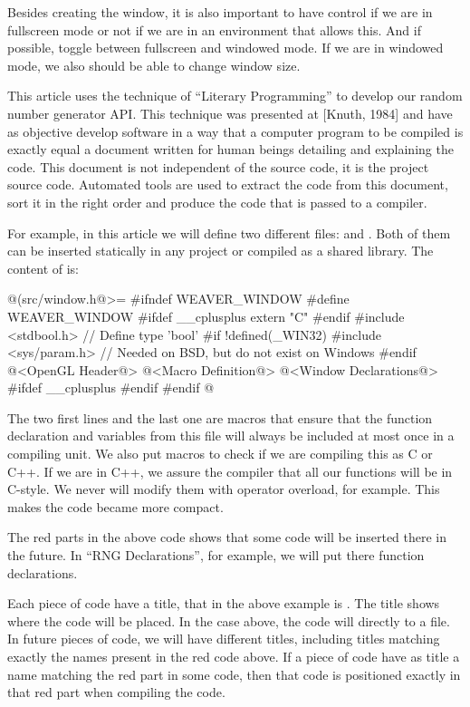 Besides creating the window, it is also important to have control if
we are in fullscreen mode or not if we are in an environment that
allows this. And if possible, toggle between fullscreen and windowed
mode. If we are in windowed mode, we also should be able to change
window size.


This article uses the technique of ``Literary Programming'' to develop
our random number generator API. This technique was presented at
[Knuth, 1984] and have as objective develop software in a way that a
computer program to be compiled is exactly equal a document written
for human beings detailing and explaining the code. This document is
not independent of the source code, it is the project source
code. Automated tools are used to extract the code from this document,
sort it in the right order and produce the code that is passed to a
compiler.

For example, in this article we will define two different
files:  and . Both of them
can be inserted statically in any project or compiled as a shared
library. The content of  is:

\iniciocodigo
@(src/window.h@>=
#ifndef WEAVER_WINDOW
#define WEAVER_WINDOW
#ifdef __cplusplus
extern "C" {
#endif
#include <stdbool.h> // Define type 'bool'
#if !defined(_WIN32)
#include <sys/param.h> // Needed on BSD, but do not exist on Windows
#endif
@<OpenGL Header@>
@<Macro Definition@>
@<Window Declarations@>
#ifdef __cplusplus
}
#endif
#endif
@
\fimcodigo

The two first lines and the last one are macros that ensure that the
function declaration and variables from this file will always be
included at most once in a compiling unit. We also put macros to check
if we are compiling this as C or C++. If we are in C++, we assure the
compiler that all our functions will be in C-style. We never will
modify them with operator overload, for example. This makes the code
became more compact.

The red parts in the above code shows that some code will be inserted
there in the future. In ``RNG Declarations'', for example, we will put
there function declarations.

Each piece of code have a title, that in the above example is
. The title shows where the code will be placed.
In the case above, the code will directly to a file. In future pieces
of code, we will have different titles, including titles matching
exactly the names present in the red code above. If a piece of code
have as title a name matching the red part in some code, then that
code is positioned exactly in that red part when compiling the code.

